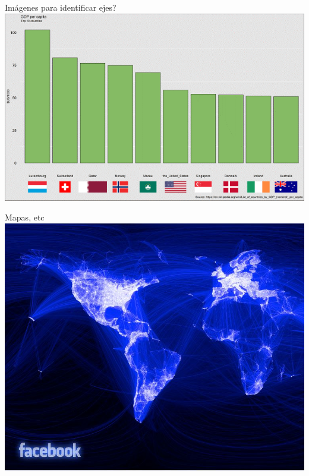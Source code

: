 \documentclass{beamer}
\begin{document}
\begin{frame}{Im\'agenes para identificar ejes?}
      \includegraphics[scale=0.5]{imagen}
  \end{frame}

\begin{frame}{Mapas, etc}
      \includegraphics[scale=0.5]{fb}
  \end{frame}
 
\end{document}
